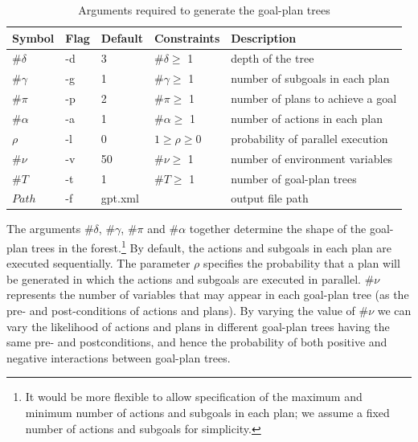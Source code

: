 \documentclass[11pt, a4paper]{article}
\begin{document}
\begin{table}[h!]
\centering
\caption{Arguments required to generate the goal-plan trees}
\label{arguments}
\begin{tabular}{|l|l|l|l|l|}
\hline
Symbol & Flag & Default & Constraints& Description \\ \hline\hline
$\#\delta$ & -d & 3 & $\#\delta\geq$ 1 & depth of the tree \\ \hline
$\#\gamma$ & -g & 1 & $\#\gamma\geq$ 1& number of subgoals in each plan  \\ \hline
$\#\pi$ &  -p & 2 & $\#\pi \geq$ 1& number of plans to achieve a goal \\ \hline
$\#\alpha$ & -a & 1 & $\#\alpha \geq$ 1& number of actions in each plan  \\ \hline
$\rho$ & -l & 0 &$1 \geq \rho \geq 0$ & probability of parallel execution  \\ \hline
$\#\nu$& -v & 50 & $\#\nu \geq$ 1& number of environment variables \\ \hline
$\#T$ & -t & 1 & $\#T \geq$ 1& number of goal-plan trees \\ \hline
$Path$ & -f & gpt.xml & \ & output file path\\  \hline
\end{tabular}
\end{table}

The arguments $\#\delta$, $\#\gamma$, $\#\pi$ and $\#\alpha$ together determine the shape of the goal-plan trees in the forest.\footnote{It would be more flexible to allow  specification of the maximum and minimum number of actions and subgoals in each plan; we assume a fixed number of actions and subgoals for simplicity.} By default, the actions and subgoals in each plan are executed sequentially. The parameter $\rho$ specifies the probability that a plan will be generated in which the actions and subgoals are executed in parallel. $\#\nu$ represents the number of variables that may appear in each goal-plan tree (as the pre- and post-conditions of actions and plans). By varying the value of $\#\nu$ we can vary the likelihood of actions and plans in different goal-plan trees having the same pre- and postconditions, and hence the probability of both positive and negative interactions between goal-plan trees.
\end{document}
